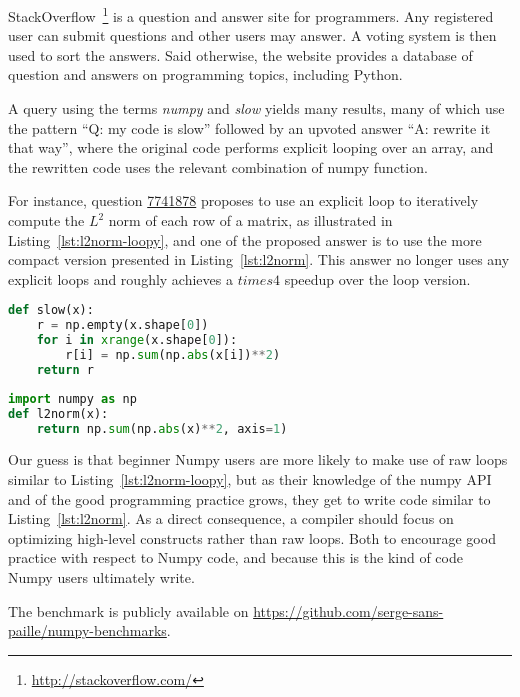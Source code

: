 \documentclass[10pt, preprint]{sigplanconf}
\begin{document}
StackOverflow~\footnote{\url{http://stackoverflow.com/}} is a question and
answer site for programmers. Any registered user can submit questions and other
users may answer. A voting system is then used to sort the answers. Said
otherwise, the website provides a database of question and answers on
programming topics, including Python.

A query using the terms \emph{numpy} and \emph{slow} yields many results, many
of which use the pattern ``Q: my code is slow'' followed by an upvoted answer
``A: rewrite it that way'', where the original code performs explicit looping
over an array, and the rewritten code uses the relevant combination of numpy
function.

For instance, question \href{http://stackoverflow.com/questions/7741878}{7741878}
proposes to use an explicit loop to iteratively compute the $L^2$ norm of each
row of a matrix, as illustrated in Listing~\ref{lst:l2norm-loopy}, and one of
the proposed answer is to use the more compact version presented in
Listing~\ref{lst:l2norm}. This answer no longer uses any explicit loops and
roughly achieves a $times 4$ speedup over the loop version.

\begin{lstlisting}[language=python,caption={Per row version of $L^2$ norm with loop in numpy.}, label={lst:l2norm-loopy}]
def slow(x):
    r = np.empty(x.shape[0])
    for i in xrange(x.shape[0]):
        r[i] = np.sum(np.abs(x[i])**2)
    return r
\end{lstlisting}

\begin{lstlisting}[language=python,caption={Per row version of $L^2$ norm without loop in numpy.}, label={lst:l2norm}]
import numpy as np
def l2norm(x):
    return np.sum(np.abs(x)**2, axis=1)
\end{lstlisting}

Our guess is that beginner Numpy users are more likely to make use of raw loops
similar to Listing~\ref{lst:l2norm-loopy}, but as their knowledge of the numpy
API and of the good programming practice grows, they get to write code similar
to Listing~\ref{lst:l2norm}. As a direct consequence, a compiler should
focus on optimizing high-level constructs rather than raw loops. Both to encourage good
practice with respect to Numpy code, and because this is the kind of code Numpy
users ultimately write.

The benchmark is publicly available on
\url{https://github.com/serge-sans-paille/numpy-benchmarks}.
\end{document}
